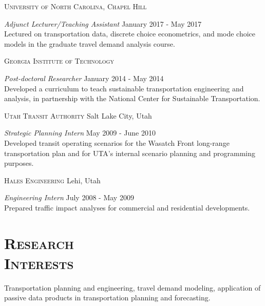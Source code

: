\documentclass[margin,line]{res}
\newcommand{\secfont}{\scshape }
\newcommand{\acc}{\scshape }
\begin{document}
\begin{resume}
{\acc University of North Carolina, Chapel Hill}

\vspace{-.4cm}
\textit{Adjunct Lecturer/Teaching Assistant} \hfill {January 2017 - May 2017}\\
Lectured on transportation data, discrete choice econometrics, and mode choice
models in the graduate travel demand analysis course.

{\acc Georgia Institute of Technology}

\vspace{-.4cm}
\textit{Post-doctoral Researcher} \hfill {January 2014 - May 2014}\\
Developed a curriculum to teach sustainable transportation engineering and
analysis, in partnership with the National Center for Sustainable
Transportation.


{\acc Utah Transit Authority} Salt Lake City, Utah

\vspace{-.3cm}
\textit{Strategic Planning Intern} \hfill {May 2009 - June 2010}\\
Developed transit operating scenarios for the Wasatch Front long-range
transportation plan and for UTA's internal scenario planning and programming purposes.

{\acc Hales Engineering} Lehi, Utah

\vspace{-.3cm}
\textit{Engineering Intern} \hfill {July 2008 - May 2009}\\
Prepared traffic impact analyses for commercial and residential developments.


\section{\secfont Research\\ Interests}
Transportation planning and engineering, travel demand modeling,
application of passive data products in transportation planning and forecasting.




\noindent\makebox[\linewidth]{\rule{\linewidth}{0.4pt}}


\end{resume}
\end{document}
